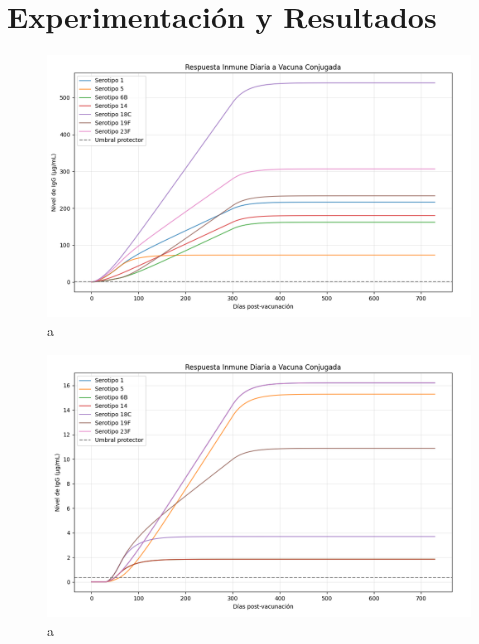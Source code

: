 \chapter{Experimentación y Resultados}\label{chapter:marcoteorico}

\begin{figure}[h] %
    \centering
    \includegraphics[width=1\textwidth]{Graphics/res.png}
    \caption{a}
    \label{fig:etiqueta}
\end{figure}

\begin{figure}[h] %
    \centering
    \includegraphics[width=1\textwidth]{Graphics/res1.png}
    \caption{a}
    \label{fig:etiqueta}
\end{figure}

